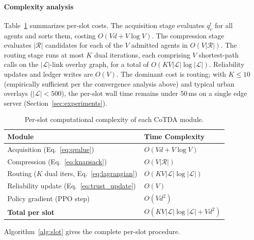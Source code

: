 \documentclass[final,3p,times,review,sort&compress]{elsarticle}
\begin{document}
\paragraph{Complexity analysis}
Table~\ref{tab:complexity} summarizes per-slot costs. The acquisition stage evaluates $q_v^t$ for all agents and sorts them, costing $O(Vd + V\log V)$. The compression stage evaluates $|\mathcal{R}|$ candidates for each of the $V$ admitted agents in $O(V|\mathcal{R}|)$. The routing stage runs at most $K$ dual iterations, each comprising $V$ shortest-path calls on the $|\mathcal{L}|$-link overlay graph, for a total of $O(KV|\mathcal{L}|\log|\mathcal{L}|)$. Reliability updates and ledger writes are $O(V)$. The dominant cost is routing; with $K\leq 10$ (empirically sufficient per the convergence analysis above) and typical urban overlays ($|\mathcal{L}|<500$), the per-slot wall time remains under 50\,ms on a single edge server (Section~\ref{sec:experiments}).

\begin{table}[t]
\centering
\caption{Per-slot computational complexity of each CoTDA module.}
\label{tab:complexity}
\begin{tabularx}{\columnwidth}{lX}
\toprule
\textbf{Module} & \textbf{Time Complexity} \\
\midrule
Acquisition (Eq.~\ref{eq:qvalue}) & $O(Vd + V\log V)$ \\
Compression (Eq.~\ref{eq:knapsack}) & $O(V|\mathcal{R}|)$ \\
Routing ($K$ dual iters, Eq.~\ref{eq:lagrangian}) & $O(KV|\mathcal{L}|\log|\mathcal{L}|)$ \\
Reliability update (Eq.~\ref{eq:trust_update}) & $O(V)$ \\
Policy gradient (PPO step) & $O(Vd^2)$ \\
\midrule
\textbf{Total per slot} & $O(KV|\mathcal{L}|\log|\mathcal{L}| + Vd^2)$ \\
\bottomrule
\end{tabularx}
\end{table}

Algorithm~\ref{alg:slot} gives the complete per-slot procedure.
\end{document}
